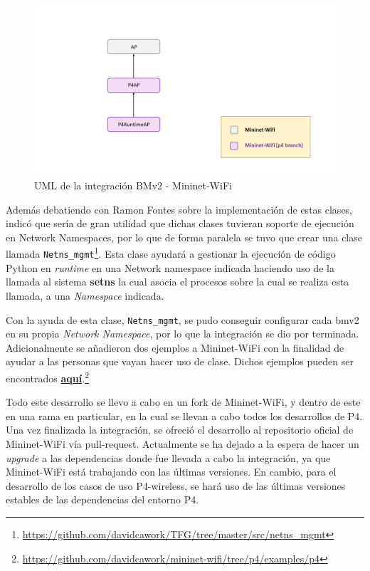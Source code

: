 \begin{figure}[ht]
    \centering
    \includegraphics[width=15.5cm]{archivos/img/dev/p4-wifi/analysis/p4_Mininet_Wifi_UML.png}
    \caption{UML de la integración BMv2 - Mininet-WiFi}
    \label{fig:analysis_p4_wifi_9}
\end{figure}

Además debatiendo con Ramon Fontes sobre la implementación de estas clases,  indicó que sería de gran utilidad que dichas clases tuvieran soporte de ejecución en Network Namespaces, por lo que de forma paralela se tuvo que crear una clase llamada \texttt{Netns\_mgmt}\footnote{\url{https://github.com/davidcawork/TFG/tree/master/src/netns_mgmt}}. Esta clase ayudará a gestionar la ejecución de código Python en \textit{runtime} en una Network namespace indicada haciendo uso de la llamada al sistema \textbf{setns} la cual asocia el procesos sobre la cual se realiza esta llamada, a una \textit{Namespace} indicada.\\
\par

Con la ayuda de esta clase, \texttt{Netns\_mgmt}, se pudo conseguir configurar cada \gls{bmv2} en su propia \textit{Network Namespace}, por lo que la integración se dio por terminada. Adicionalmente se añadieron dos ejemplos a Mininet-WiFi con la finalidad de ayudar a las personas que vayan hacer uso de clase. Dichos ejemplos pueden ser encontrados \href{https://github.com/davidcawork/mininet-wifi/tree/p4/examples/p4}{\textbf{aquí}}.\footnote{\url{https://github.com/davidcawork/mininet-wifi/tree/p4/examples/p4}}\\
\par
Todo este desarrollo se llevo a cabo en un fork de Mininet-WiFi, y dentro de este en una rama en particular, en la cual se llevan a cabo todos los desarrollos de P4. Una vez finalizada la integración, se ofreció el desarrollo al repositorio oficial de Mininet-WiFi vía pull-request. Actualmente se ha dejado a la espera de hacer un \textit{upgrade} a las dependencias donde fue llevada a cabo la integración, ya que Mininet-WiFi está trabajando con las últimas versiones. En cambio, para el desarrollo de los casos de uso P4-wireless, se hará uso de las últimas versiones  estables de las dependencias del entorno P4.

